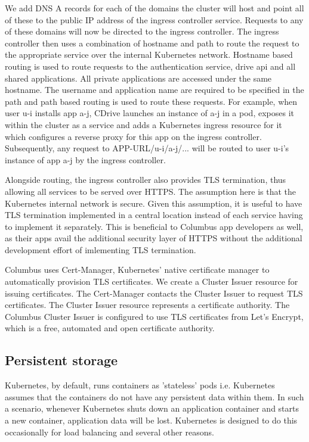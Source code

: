We add DNS A records for each of the domains the cluster will host and point all of these to the 
public IP address of the ingress controller service. Requests to any of these domains will now be
directed to the ingress controller. The ingress controller then uses a combination of hostname and
path to route the request to the appropriate service over the internal Kubernetes network. Hostname
based routing is used to route requests to the authentication service, drive api and all shared 
applications. All private applications are accessed under the same hostname. The username and 
application name are required to be specified in the path and path based routing is used to route 
these requests. For example, when user u-i installs app a-j, CDrive launches an instance of a-j
in a pod, exposes it within the cluster as a service and adds a Kubernetes ingress resource for it
which configures a reverse proxy for this app on the ingress controller. Subsequently, any request 
to APP-URL/u-i/a-j/... will be routed to user u-i's instance of app a-j by the ingress
controller.


Alongside routing, the ingress controller also provides TLS termination, thus allowing all services
to be served over HTTPS. The assumption here is that the Kubernetes internal network is secure. 
Given this assumption, it is useful to have TLS termination implemented in a central location 
instead of each service having to implement it separately. This is beneficial to Columbus app 
developers as well, as their apps avail the additional security layer of HTTPS without the
additional development effort of imlementing TLS termination.


Columbus uses Cert-Manager, Kubernetes’ native certificate manager to automatically provision TLS
certificates. We create a Cluster Issuer resource for issuing certificates. The Cert-Manager
contacts the Cluster Issuer to request TLS certificates. The Cluster Issuer resource represents a
certificate authority. The Columbus Cluster Issuer is configured to use TLS certificates from
Let’s Encrypt, which is a free, automated and open certificate authority. 

\subsection{Persistent storage}
Kubernetes, by default, runs containers as 'stateless' pods i.e. Kubernetes assumes that the 
containers do not have any persistent data within them. In such a scenario, whenever Kubernetes 
shuts down an application container and starts a new container, application data will be lost. 
Kubernetes is designed to do this occasionally for load balancing and several other reasons.


